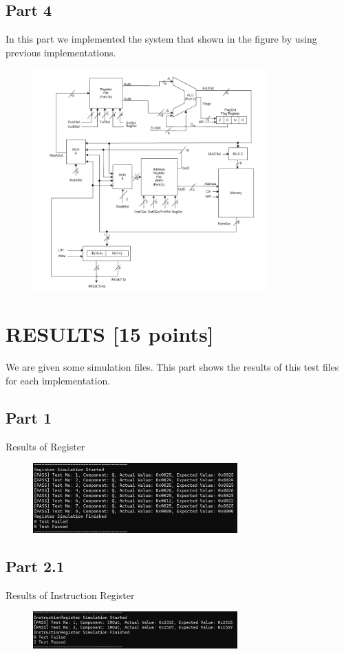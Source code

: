 \documentclass[pdftex,12pt,a4paper]{article}
\begin{document}
\subsection{Part 4}
In this part we implemented the system that shown in the figure by using previous implementations.
\begin{figure}[htbp]
	\centering
	\includegraphics[width=0.8\textwidth]{Part 4 Image}
\end{figure}
\newpage
\section{RESULTS [15 points]}
We are given some simulation files. This part shows the results of this test files for each implementation.\par 
\subsection{Part 1}
Results of Register \par
\begin{figure}[H]
	\centering
	\includegraphics[width=0.7\textwidth]{R}
\end{figure}
\subsection{Part 2.1}
Results of Instruction Register \par
\begin{figure}[htbp]
	\centering
	\includegraphics[width=0.7\textwidth]{IR}
\end{figure}
\end{document}
